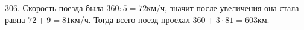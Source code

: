 306. Скорость поезда была $360:5=72$км/ч, значит после увеличения она стала равна $72+9=81$км/ч. Тогда всего поезд проехал $360+3\cdot81=603$км.\\
